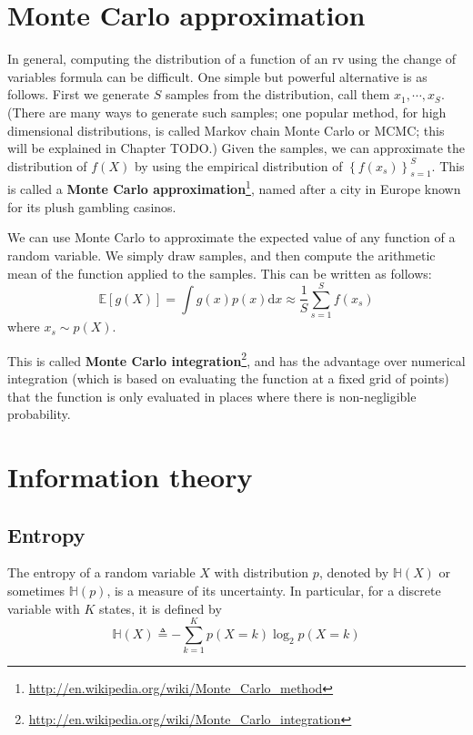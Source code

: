 \documentclass[graybox, envcountchap, twocolumn]{styles/svmult}
\begin{document}
\section{Monte Carlo approximation}
\label{sec:Monte-Carlo-approximation}
In general, computing the distribution of a function of an rv using the change of variables formula can be difficult. One simple but powerful alternative is as follows. First we generate $S$ samples from the distribution, call them $x_1,\cdots,x_S$. (There are many ways to generate such samples; one popular method, for high dimensional distributions, is called Markov chain Monte Carlo or MCMC; this will be explained in Chapter TODO.) Given the samples, we can approximate the distribution of $f(X)$ by using the empirical distribution of $\left\{f(x_s)\right\}_{s=1}^S$. This is called a \textbf{Monte Carlo approximation}\footnote{\url{http://en.wikipedia.org/wiki/Monte_Carlo_method}}, named after a city in Europe known for its plush gambling casinos.

We can use Monte Carlo to approximate the expected value of any function of a random variable. We simply draw samples, and then compute the arithmetic mean of the function applied to the samples. This can be written as follows:
\begin{equation}
\mathbb{E}[g(X)]=\int g(x)p(x)\mathrm{d}x \approx \dfrac{1}{S}\sum\limits_{s=1}^S f(x_s)
\end{equation}
where $x_s \sim p(X)$.

This is called \textbf{Monte Carlo integration}\footnote{\url{http://en.wikipedia.org/wiki/Monte_Carlo_integration}}, and has the advantage over numerical integration (which is based on evaluating the function at a fixed grid of points) that the function is only evaluated in places where there is non-negligible probability.


\section{Information theory}

\subsection{Entropy}
\label{sec:Entropy}
The entropy of a random variable $X$ with distribution $p$, denoted by $\mathbb{H}(X)$ or sometimes $\mathbb{H}(p)$, is a measure of its uncertainty. In particular, for a discrete variable with $K$ states, it is defined by
\begin{equation}
\mathbb{H}(X) \triangleq -\sum\limits_{k=1}^{K}{p(X=k)\log_2p(X=k)}
\end{equation}
\end{document}
